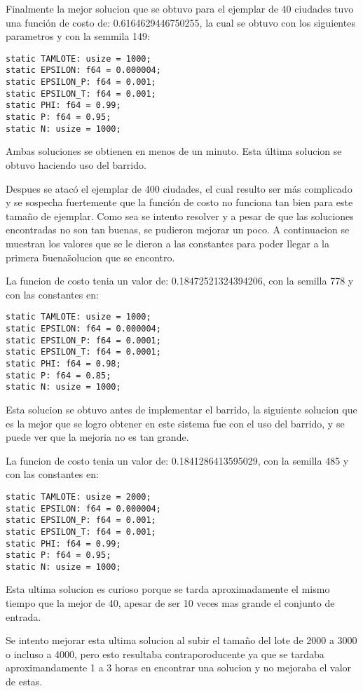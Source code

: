 \documentclass[12pt]{article}
\begin{document}
Finalmente la mejor solucion que se obtuvo para el ejemplar de 40 ciudades tuvo una función de costo de: 0.6164629446750255, la cual se obtuvo con los siguientes parametros y con la semmila 149:

\begin{verbatim}
static TAMLOTE: usize = 1000;
static EPSILON: f64 = 0.000004;
static EPSILON_P: f64 = 0.001;
static EPSILON_T: f64 = 0.001;
static PHI: f64 = 0.99;
static P: f64 = 0.95;
static N: usize = 1000;
\end{verbatim}

Ambas soluciones se obtienen en menos de un minuto. Esta última solucion se obtuvo haciendo uso del barrido.

Despues se atacó el ejemplar de 400 ciudades, el cual resulto ser más complicado y se sospecha fuertemente que la función de costo no funciona tan bien para este tamaño de ejemplar. Como sea se intento resolver y a pesar de que las soluciones encontradas no son tan buenas, se pudieron mejorar un poco. A continuacion se muestran los valores que se le dieron a las constantes para poder llegar a la primera \"buena\" solucion que se encontro.

La funcion de costo tenia un valor de: 0.18472521324394206, con la semilla 778 y con las constantes en:

\begin{verbatim}
static TAMLOTE: usize = 1000;
static EPSILON: f64 = 0.000004;
static EPSILON_P: f64 = 0.0001;
static EPSILON_T: f64 = 0.0001;
static PHI: f64 = 0.98;
static P: f64 = 0.85;
static N: usize = 1000;
\end{verbatim}

Esta solucion se obtuvo antes de implementar el barrido, la siguiente solucion que es la mejor que se logro obtener en este sistema fue con el uso del barrido, y se puede ver que la mejoria no es tan grande.

La funcion de costo tenia un valor de: 0.1841286413595029, con la semilla 485 y con las constantes en:

\begin{verbatim}
static TAMLOTE: usize = 2000;
static EPSILON: f64 = 0.000004;
static EPSILON_P: f64 = 0.001;
static EPSILON_T: f64 = 0.001;
static PHI: f64 = 0.99;
static P: f64 = 0.95;
static N: usize = 1000;
\end{verbatim}

Esta ultima solucion es curioso porque se tarda aproximadamente el mismo tiempo que la mejor de 40, apesar de ser 10 veces mas grande el conjunto de entrada.

Se intento mejorar esta ultima solucion al subir el tamaño del lote de 2000 a 3000 o incluso a 4000, pero esto resultaba contraporoducente ya que se tardaba aproximandamente 1 a 3 horas en encontrar una solucion y no mejoraba el valor de estas.
\end{document}

